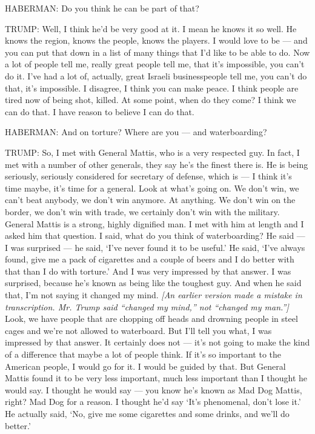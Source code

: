 HABERMAN: Do you think he can be part of that?

TRUMP: Well, I think he'd be very good at it. I mean he knows it so
well. He knows the region, knows the people, knows the players. I would
love to be --- and you can put that down in a list of many things that
I'd like to be able to do. Now a lot of people tell me, really great
people tell me, that it's impossible, you can't do it. I've had a lot
of, actually, great Israeli businesspeople tell me, you can't do that,
it's impossible. I disagree, I think you can make peace. I think people
are tired now of being shot, killed. At some point, when do they come? I
think we can do that. I have reason to believe I can do that.

HABERMAN: And on torture? Where are you --- and waterboarding?

TRUMP: So, I met with General Mattis, who is a very respected guy. In
fact, I met with a number of other generals, they say he's the finest
there is. He is being seriously, seriously considered for secretary of
defense, which is --- I think it's time maybe, it's time for a general.
Look at what's going on. We don't win, we can't beat anybody, we don't
win anymore. At anything. We don't win on the border, we don't win with
trade, we certainly don't win with the military. General Mattis is a
strong, highly dignified man. I met with him at length and I asked him
that question. I said, what do you think of waterboarding? He said --- I
was surprised --- he said, `I've never found it to be useful.' He said,
`I've always found, give me a pack of cigarettes and a couple of beers
and I do better with that than I do with torture.' And I was very
impressed by that answer. I was surprised, because he's known as being
like the toughest guy. And when he said that, I'm not saying it changed
my mind. \emph{{[}An earlier version made a mistake in transcription.
Mr. Trump said ``changed my mind,'' not ``changed my man.''{]}} Look, we
have people that are chopping off heads and drowning people in steel
cages and we're not allowed to waterboard. But I'll tell you what, I was
impressed by that answer. It certainly does not --- it's not going to
make the kind of a difference that maybe a lot of people think. If it's
so important to the American people, I would go for it. I would be
guided by that. But General Mattis found it to be very less important,
much less important than I thought he would say. I thought he would say
--- you know he's known as Mad Dog Mattis, right? Mad Dog for a reason.
I thought he'd say `It's phenomenal, don't lose it.' He actually said,
`No, give me some cigarettes and some drinks, and we'll do better.'

